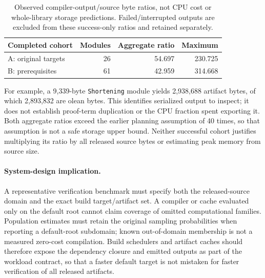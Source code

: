 \documentclass[10pt,twocolumn]{article}
\begin{document}
\begin{table}[t]
\centering\small
\setlength{\tabcolsep}{4pt}
\begin{tabular}{@{}lrrr@{}}
\toprule
Completed cohort & Modules & Aggregate ratio & Maximum\\
\midrule
A: original targets &26&54.697&230.725\\
B: prerequisites &61&42.959&314.668\\
\bottomrule
\end{tabular}
\caption{Observed compiler-output/source byte ratios, not CPU cost or
whole-library storage predictions. Failed/interrupted outputs are excluded
from these success-only ratios and retained separately.}
\label{tab:artifact-growth}
\end{table}

For example, a 9,339-byte \texttt{Shortening} module yields 2,938,688
artifact bytes, of which 2,893,832 are olean bytes.
This identifies serialized output to inspect; it does not establish
proof-term duplication or the CPU fraction spent exporting it.
Both aggregate ratios exceed the earlier planning assumption of 40 times,
so that assumption is not a safe storage upper bound.
Neither successful cohort justifies multiplying its ratio by all released
source bytes or estimating peak memory from source size.

\paragraph{System-design implication.}
A representative verification benchmark must specify both the released-source
domain and the exact build target/artifact set.
A compiler or cache evaluated only on the default root cannot claim coverage
of omitted computational families. Population estimates must retain the
original sampling probabilities when reporting a default-root subdomain;
known out-of-domain membership is not a measured zero-cost compilation.
Build schedulers and artifact caches should therefore expose the dependency
closure and emitted outputs as part of the workload contract, so that a
faster default target is not mistaken for faster verification of all
released artifacts.
\end{document}

